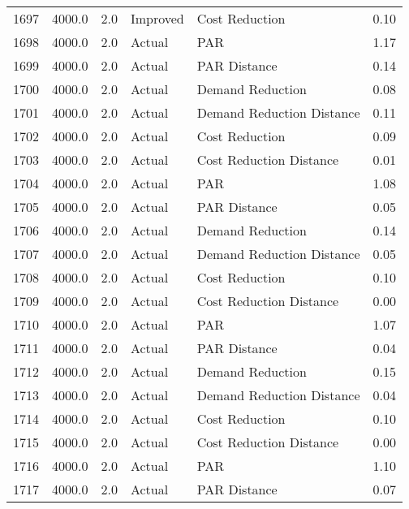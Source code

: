 \begin{longtable}{lrrllr}
1697 &       4000.0 &     2.0 &       Improved &             Cost Reduction &   0.10 \\
1698 &       4000.0 &     2.0 &         Actual &                        PAR &   1.17 \\
1699 &       4000.0 &     2.0 &         Actual &               PAR Distance &   0.14 \\
1700 &       4000.0 &     2.0 &         Actual &           Demand Reduction &   0.08 \\
1701 &       4000.0 &     2.0 &         Actual &  Demand Reduction Distance &   0.11 \\
1702 &       4000.0 &     2.0 &         Actual &             Cost Reduction &   0.09 \\
1703 &       4000.0 &     2.0 &         Actual &    Cost Reduction Distance &   0.01 \\
1704 &       4000.0 &     2.0 &         Actual &                        PAR &   1.08 \\
1705 &       4000.0 &     2.0 &         Actual &               PAR Distance &   0.05 \\
1706 &       4000.0 &     2.0 &         Actual &           Demand Reduction &   0.14 \\
1707 &       4000.0 &     2.0 &         Actual &  Demand Reduction Distance &   0.05 \\
1708 &       4000.0 &     2.0 &         Actual &             Cost Reduction &   0.10 \\
1709 &       4000.0 &     2.0 &         Actual &    Cost Reduction Distance &   0.00 \\
1710 &       4000.0 &     2.0 &         Actual &                        PAR &   1.07 \\
1711 &       4000.0 &     2.0 &         Actual &               PAR Distance &   0.04 \\
1712 &       4000.0 &     2.0 &         Actual &           Demand Reduction &   0.15 \\
1713 &       4000.0 &     2.0 &         Actual &  Demand Reduction Distance &   0.04 \\
1714 &       4000.0 &     2.0 &         Actual &             Cost Reduction &   0.10 \\
1715 &       4000.0 &     2.0 &         Actual &    Cost Reduction Distance &   0.00 \\
1716 &       4000.0 &     2.0 &         Actual &                        PAR &   1.10 \\
1717 &       4000.0 &     2.0 &         Actual &               PAR Distance &   0.07 \\

\end{longtable}
